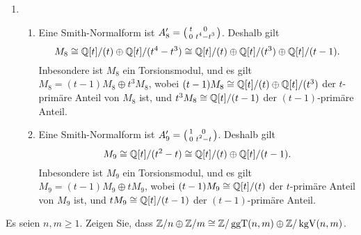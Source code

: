 \begin{solution}
\begin{enumerate}
\begin{enumerate}
      \end{enumerate}
    \item
      \begin{enumerate}
        \item
          Eine Smith-Normalform ist $A_8' = \begin{psmallmatrix} t & 0 \\ 0 & t^4-t^3 \end{psmallmatrix}$.
          Deshalb gilt
          \[
                  M_8
            \cong \mathbb{Q}[t]/(t) \oplus \mathbb{Q}[t]/(t^4 - t^3)
            \cong \mathbb{Q}[t]/(t)  \oplus \mathbb{Q}[t]/(t^3) \oplus \mathbb{Q}[t]/(t-1).
          \]
          Inbesondere ist $M_8$ ein Torsionsmodul, und es gilt $M_8 = (t-1) M_8 \oplus t^3 M_8$, wobei $(t-1) M_8 \cong \mathbb{Q}[t]/(t) \oplus \mathbb{Q}[t]/(t^3)$ der $t$-primäre Anteil von $M_8$ ist, und $t^3 M_8 \cong \mathbb{Q}[t]/(t-1)$ der $(t-1)$-primäre Anteil.
        \item
          Eine Smith-Normalform ist $A_9' = \begin{psmallmatrix} 1 & 0 \\ 0 & t^2 - t \end{psmallmatrix}$.
          Deshalb gilt
          \[
                  M_9
            \cong \mathbb{Q}[t]/(t^2 - t)
            \cong \mathbb{Q}[t]/(t) \oplus \mathbb{Q}[t]/(t-1).
          \]
          Inbesondere ist $M_9$ ein Torsionsmodul, und es gilt $M_9 = (t-1) M_9 \oplus t M_9$, wobei $(t-1) M_9 \cong \mathbb{Q}[t]/(t)$ der $t$-primäre Anteil von $M_9$ ist, und $t M_9 \cong \mathbb{Q}[t]/(t-1)$ der $(t-1)$-primäre Anteil.
      \end{enumerate}
  \end{enumerate}
\end{solution}


\begin{question}
  Es seien $n, m \geq 1$.
  Zeigen Sie, dass $\mathbb{Z}/n \oplus \mathbb{Z}/m \cong \mathbb{Z}/\operatorname{ggT}(n,m) \oplus \mathbb{Z}/\operatorname{kgV}(n,m)$.
\end{question}


